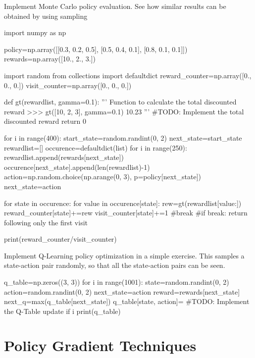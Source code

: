 \begin{exercise}
Implement Monte Carlo policy evaluation. See how similar results can be
obtained by using sampling
\begin{python}
import numpy as np

policy=np.array([[0.3, 0.2, 0.5], [0.5, 0.4, 0.1], [0.8, 0.1, 0.1]])
rewards=np.array([10., 2., 3.])

import random
from collections import defaultdict
reward_counter=np.array([0., 0., 0.])
visit_counter=np.array([0., 0., 0.])

def gt(rewardlist, gamma=0.1):
    '''
    Function to calculate the total discounted reward
    >>> gt([10, 2, 3], gamma=0.1)
    10.23
    '''
    #TODO: Implement the total discounted reward
    return 0

for i in range(400):
    start_state=random.randint(0, 2)
    next_state=start_state
    rewardlist=[]
    occurence=defaultdict(list) 
    for i in range(250):
        rewardlist.append(rewards[next_state]) 
        occurence[next_state].append(len(rewardlist)-1) 
        action=np.random.choice(np.arange(0, 3), p=policy[next_state]) 
        next_state=action

    for state in occurence: 
        for value in occurence[state]: 
            rew=gt(rewardlist[value:]) 
            reward_counter[state]+=rew 
            visit_counter[state]+=1 
            #break #if break: return following only the first visit

print(reward_counter/visit_counter)
\end{python}
\end{exercise}
\begin{exercise}
Implement Q-Learning policy optimization in a simple exercise. This samples a state-action pair randomly, so that all the state-action pairs can be seen.
\begin{python}
q_table=np.zeros((3, 3)) 
for i in range(1001): 
    state=random.randint(0, 2) 
    action=random.randint(0, 2) 
    next_state=action
    reward=rewards[next_state] 
    next_q=max(q_table[next_state])
    q_table[state, action]= #TODO: Implement the Q-Table update
    if i%
        print(q_table)
\end{python}
\end{exercise}


\section{Policy Gradient Techniques}

